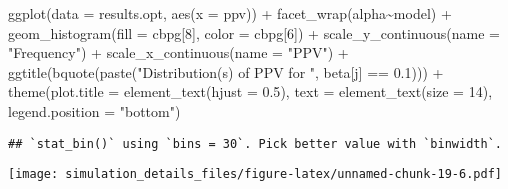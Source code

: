 \documentclass[
]{article}
\newenvironment{Shaded}{\begin{snugshade}}{\end{snugshade}}
\newcommand{\AttributeTok}[1]{\textcolor[rgb]{0.77,0.63,0.00}{#1}}
\newcommand{\DecValTok}[1]{\textcolor[rgb]{0.00,0.00,0.81}{#1}}
\newcommand{\FloatTok}[1]{\textcolor[rgb]{0.00,0.00,0.81}{#1}}
\newcommand{\FunctionTok}[1]{\textcolor[rgb]{0.00,0.00,0.00}{#1}}
\newcommand{\NormalTok}[1]{#1}
\newcommand{\SpecialCharTok}[1]{\textcolor[rgb]{0.00,0.00,0.00}{#1}}
\newcommand{\StringTok}[1]{\textcolor[rgb]{0.31,0.60,0.02}{#1}}
\begin{document}
\begin{Shaded}
\begin{Highlighting}[]
\FunctionTok{ggplot}\NormalTok{(}\AttributeTok{data =}\NormalTok{ results.opt,}
       \FunctionTok{aes}\NormalTok{(}\AttributeTok{x =}\NormalTok{ ppv)) }\SpecialCharTok{+}
  \FunctionTok{facet\_wrap}\NormalTok{(alpha}\SpecialCharTok{\textasciitilde{}}\NormalTok{model) }\SpecialCharTok{+}
  \FunctionTok{geom\_histogram}\NormalTok{(}\AttributeTok{fill =}\NormalTok{ cbpg[}\DecValTok{8}\NormalTok{], }\AttributeTok{color =}\NormalTok{ cbpg[}\DecValTok{6}\NormalTok{]) }\SpecialCharTok{+}
  \FunctionTok{scale\_y\_continuous}\NormalTok{(}\AttributeTok{name =} \StringTok{"Frequency"}\NormalTok{) }\SpecialCharTok{+}
  \FunctionTok{scale\_x\_continuous}\NormalTok{(}\AttributeTok{name =} \StringTok{"PPV"}\NormalTok{) }\SpecialCharTok{+}
  \FunctionTok{ggtitle}\NormalTok{(}\FunctionTok{bquote}\NormalTok{(}\FunctionTok{paste}\NormalTok{(}\StringTok{"Distribution(s) of PPV for "}\NormalTok{, beta[j] }\SpecialCharTok{==} \FloatTok{0.1}\NormalTok{))) }\SpecialCharTok{+}
  \FunctionTok{theme}\NormalTok{(}\AttributeTok{plot.title =} \FunctionTok{element\_text}\NormalTok{(}\AttributeTok{hjust =} \FloatTok{0.5}\NormalTok{), }
        \AttributeTok{text =} \FunctionTok{element\_text}\NormalTok{(}\AttributeTok{size =} \DecValTok{14}\NormalTok{),}
        \AttributeTok{legend.position =} \StringTok{"bottom"}\NormalTok{)}
\end{Highlighting}
\end{Shaded}

\begin{verbatim}
## `stat_bin()` using `bins = 30`. Pick better value with `binwidth`.
\end{verbatim}

\texttt{[image: simulation\_details\_files/figure-latex/unnamed-chunk-19-6.pdf]}
\end{document}
